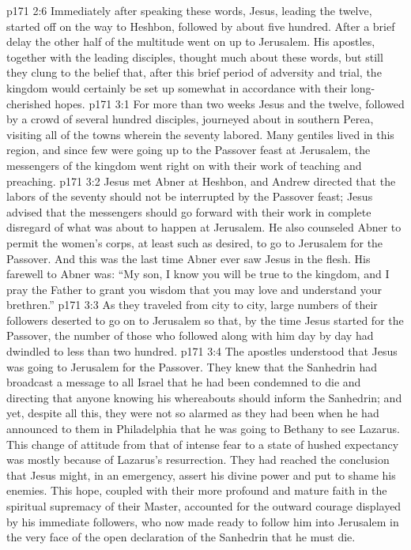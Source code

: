 \pc \vs p171 2:6 Immediately after speaking these words, Jesus, leading the twelve, started off on the way to Heshbon, followed by about five hundred. After a brief delay the other half of the multitude went on up to Jerusalem. His apostles, together with the leading disciples, thought much about these words, but still they clung to the belief that, after this brief period of adversity and trial, the kingdom would certainly be set up somewhat in accordance with their long\hyp{}cherished hopes.\plusone
{}
\vs p171 3:1 For more than two weeks Jesus and the twelve, followed by a crowd of several hundred disciples, journeyed about in southern Perea, visiting all of the towns wherein the seventy labored. Many gentiles lived in this region, and since few were going up to the Passover feast at Jerusalem, the messengers of the kingdom went right on with their work of teaching and preaching.
\vs p171 3:2 Jesus met Abner at Heshbon, and Andrew directed that the labors of the seventy should not be interrupted by the Passover feast; Jesus advised that the messengers should go forward with their work in complete disregard of what was about to happen at Jerusalem. He also counseled Abner to permit the women’s corps, at least such as desired, to go to Jerusalem for the Passover. And this was the last time Abner ever saw Jesus in the flesh. His farewell to Abner was: \textcolor{ubdarkred}{“My son, I know you will be true to the kingdom, and I pray the Father to grant you wisdom that you may love and understand your brethren.”}
\vs p171 3:3 As they traveled from city to city, large numbers of their followers deserted to go on to Jerusalem so that, by the time Jesus started for the Passover, the number of those who followed along with him day by day had dwindled to less than two hundred.
\vs p171 3:4 The apostles understood that Jesus was going to Jerusalem for the Passover. They knew that the Sanhedrin had broadcast a message to all Israel that he had been condemned to die and directing that anyone knowing his whereabouts should inform the Sanhedrin; and yet, despite all this, they were not so alarmed as they had been when he had announced to them in Philadelphia that he was going to Bethany to see Lazarus. This change of attitude from that of intense fear to a state of hushed expectancy was mostly because of Lazarus’s resurrection. They had reached the conclusion that Jesus might, in an emergency, assert his divine power and put to shame his enemies. This hope, coupled with their more profound and mature faith in the spiritual supremacy of their Master, accounted for the outward courage displayed by his immediate followers, who now made ready to follow him into Jerusalem in the very face of the open declaration of the Sanhedrin that he must die.\plusone
